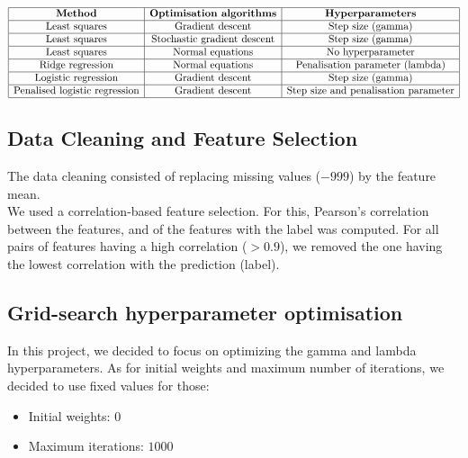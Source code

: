 \documentclass{article}
\begin{document}
	
	$$
	\begin{array}{|c|c|c|}
	\hline
	\textbf{Method} & \textbf{Optimisation algorithms} & \textbf{Hyperparameters} \\
	\hline
	\text{Least squares} & \text{Gradient descent} & \text{Step size (gamma)} \\
	\hline
	\text{Least squares} & \text{Stochastic gradient descent} &\text{Step size (gamma)} \\
	\hline
	\text{Least squares} & \text{Normal equations} & \text{No hyperparameter} \\
	\hline
	\text{Ridge regression} & \text{Normal equations} & \text{Penalisation parameter (lambda)} \\
	\hline
	\text{Logistic regression} & \text{Gradient descent} & \text{Step size (gamma)} \\
	\hline
	\text{Penalised logistic regression} & \text{Gradient descent} & \text{Step size and penalisation parameter} \\
	\hline
	\end{array}
	$$
	
	\subsection{Data Cleaning and Feature Selection}
	The data cleaning consisted of replacing missing values ($-999$) by the feature mean.
	\\
	We used a correlation-based feature selection. For this, Pearson’s correlation between the features, and of the features with the label was computed. For all pairs of features having a high correlation ($> 0.9$), we removed the one having the lowest correlation with the prediction (label).
	
	\subsection{Grid-search hyperparameter optimisation}
	In this project, we decided to focus on optimizing the gamma and lambda hyperparameters. As for initial weights and maximum number of iterations, we decided to use fixed values for those: \begin{itemize}
		\item Initial weights: $0$
		\item Maximum iterations: $1000$
	\end{itemize}
\end{document}
